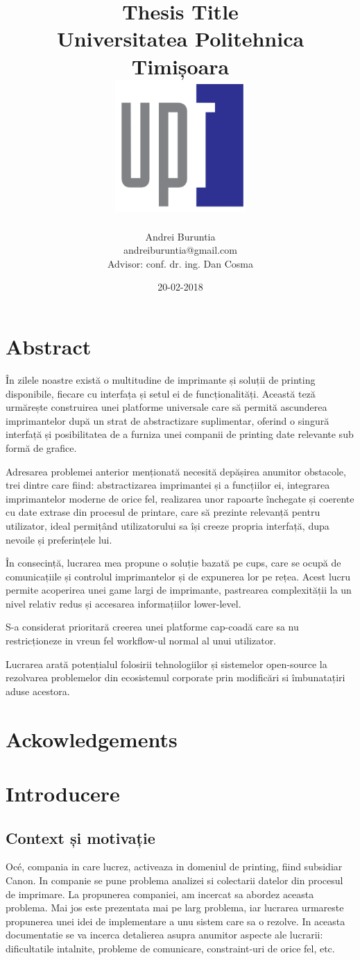 \documentclass[12pt]{report}
\title{
	{Thesis Title}\\
	{\large Universitatea Politehnica Timișoara}\\
	{\includegraphics[width=50mm]{upt_logo.png}}
}
\author{Andrei Buruntia \\ andreiburuntia@gmail.com\\[1cm]{ Advisor: conf. dr. ing. Dan Cosma}}
\date{20-02-2018}
\begin{document}
\maketitle
\chapter*{Abstract}
În zilele noastre există o multitudine de imprimante și soluții de printing disponibile, fiecare cu interfața și setul ei de funcționalități. Această teză urmărește construirea unei platforme universale care să permită ascunderea imprimantelor după un strat de abstractizare suplimentar, oferind o singură interfață și posibilitatea de a furniza unei companii de printing date relevante sub formă de grafice.

Adresarea problemei anterior menționată necesită depășirea anumitor obstacole, trei dintre care fiind: abstractizarea imprimantei și a funcțiilor ei, integrarea imprimantelor moderne de orice fel, realizarea unor rapoarte închegate și coerente cu date extrase din procesul de printare, care să prezinte relevanță pentru utilizator, ideal permițând utilizatorului sa își creeze propria interfață, dupa nevoile și preferințele lui.

În consecință, lucrarea mea propune o soluție bazată pe \acrshort{cups}, care se ocupă de comunicațiile și controlul imprimantelor și de expunerea lor pe rețea. Acest lucru permite acoperirea unei game largi de imprimante, pastrearea complexității la un nivel relativ redus și accesarea informațiilor lower-level.

S-a considerat prioritară creerea unei platforme cap-coadă care sa nu restricționeze in vreun fel workflow-ul normal al unui utilizator.

Lucrarea arată potențialul folosirii tehnologiilor și sistemelor open-source la rezolvarea problemelor din ecosistemul corporate prin modificări si îmbunatațiri aduse acestora.

\chapter*{Ackowledgements}

\tableofcontents

\newpage

\chapter{Introducere}

	\section{Context și motivație}
Océ, compania in care lucrez, activeaza in domeniul de printing, fiind subsidiar Canon. In companie se pune problema analizei si colectarii datelor din procesul de imprimare. La propunerea companiei, am incercat sa abordez aceasta problema. Mai jos este prezentata mai pe larg problema, iar lucrarea urmareste propunerea unei idei de implementare a unu sistem care sa o rezolve. In aceasta documentatie se va incerca detalierea asupra anumitor aspecte ale lucrarii: dificultatile intalnite, probleme de comunicare, constraint-uri de orice fel, etc.
\end{document}
